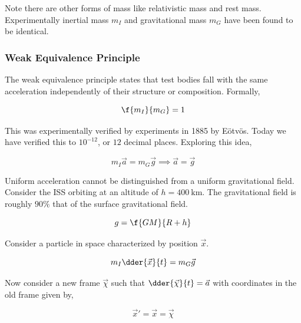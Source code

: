 \documentclass{article}
\begin{document}
Note there are other forms of mass like relativistic mass and rest mass. \\

Experimentally inertial mass $m_I$ and gravitational mass $m_G$ have been found to be identical.

\subsubsection{Weak Equivalence Principle}

The weak equivalence principle states that test bodies fall with the same acceleration independently of their structure or composition. Formally,

\[ \f{m_I}{m_G} = 1 \]

This was experimentally verified by experiments in 1885 by Eötvös. Today we have verified this to $10^{-12}$, or $12$ decimal places. Exploring this idea,

\[ m_I \vec{a} = m_G \vec{g} \implies \vec{a} = \vec{g} \]

Uniform acceleration cannot be distinguished from a uniform gravitational field. \\

Consider the ISS orbiting at an altitude of $h = \SI{400}{\km}$. The gravitational field is roughly $90\%$ that of the surface gravitational field.

\[ g = \f{GM}{R+h} \]

Consider a particle in space characterized by position $\vec{x}$.

\[ m_I \dder{\vec{x}}{t} = m_G \vec{g} \]

Now consider a new frame $\vec{\chi}$ such that $\dder{\vec{\chi}}{t} = \vec{a}$ with coordinates in the old frame given by,

\[ \vec{x}' = \vec{x} = \vec{\chi} \]


\begin{center}
\end{center}
\end{document}
